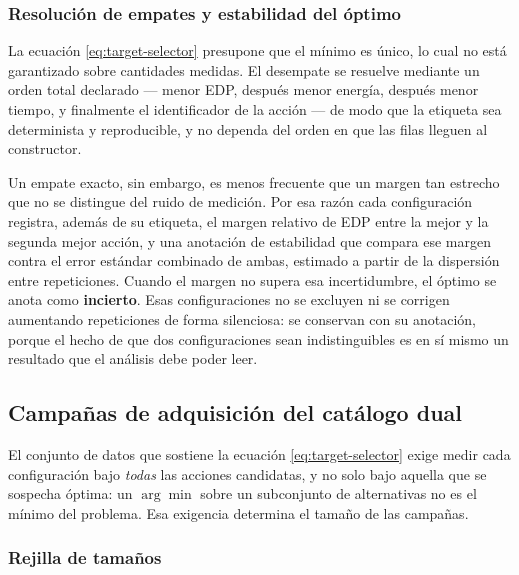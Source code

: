 \documentclass[12pt,oneside,spanish]{book}
\begin{document}
\subsubsection*{Resolución de empates y estabilidad del óptimo}

La ecuación \eqref{eq:target-selector} presupone que el mínimo es único, lo cual no está garantizado sobre cantidades medidas. El desempate se resuelve mediante un orden total declarado --- menor EDP, después menor energía, después menor tiempo, y finalmente el identificador de la acción --- de modo que la etiqueta sea determinista y reproducible, y no dependa del orden en que las filas lleguen al constructor.

Un empate exacto, sin embargo, es menos frecuente que un margen tan estrecho que no se distingue del ruido de medición. Por esa razón cada configuración registra, además de su etiqueta, el margen relativo de EDP entre la mejor y la segunda mejor acción, y una anotación de estabilidad que compara ese margen contra el error estándar combinado de ambas, estimado a partir de la dispersión entre repeticiones. Cuando el margen no supera esa incertidumbre, el óptimo se anota como \textbf{incierto}. Esas configuraciones no se excluyen ni se corrigen aumentando repeticiones de forma silenciosa: se conservan con su anotación, porque el hecho de que dos configuraciones sean indistinguibles es en sí mismo un resultado que el análisis debe poder leer.

\subsection{Campañas de adquisición del catálogo dual}
\label{sec:fase2-campanas}

El conjunto de datos que sostiene la ecuación \eqref{eq:target-selector} exige medir cada configuración bajo \textit{todas} las acciones candidatas, y no solo bajo aquella que se sospecha óptima: un $\arg\min$ sobre un subconjunto de alternativas no es el mínimo del problema. Esa exigencia determina el tamaño de las campañas.

\subsubsection*{Rejilla de tamaños}
\end{document}
